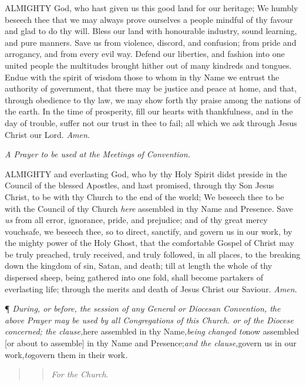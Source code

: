 ALMIGHTY
God, who hast given us this good land for our heritage; We humbly beseech
thee that we may always prove ourselves a people mindful of thy favour
and glad to do thy will. Bless our land with honourable industry, sound
learning, and pure manners. Save us from violence, discord, and confusion;
from pride and arrogancy, and from every evil way. Defend our liberties,
and fashion into one united people the multitudes brought hither out of
many kindreds and tongues. Endue with the spirit of wisdom those to whom
in thy Name we entrust the authority of government, that there may be
justice and peace at home, and that, through obedience to thy law, we
may show forth thy praise among the nations of the earth. In the time
of prosperity, fill our hearts with thankfulness, and in the day of trouble,
suffer not our trust in thee to fail; all which we ask through Jesus Christ
our Lord. \emph{Amen.}

\emph{A
Prayer to be used at the Meetings of Convention.}

ALMIGHTY
and everlasting God, who by thy Holy Spirit didst preside in the Council
of the blessed Apostles, and hast promised, through thy Son Jesus Christ,
to be with thy Church to the end of the world; We beseech thee to be with
the Council of thy Church \emph{here} assembled in thy Name and Presence.
Save \emph{us} from all error, ignorance, pride, and prejudice; and
of thy great mercy vouchsafe, we beseech thee, so to direct, sanctify,
and govern us in our work, by the mighty power of the Holy Ghost, that
the comfortable Gospel of Christ may be truly preached, truly received,
and truly followed, in all places, to the breaking down the kingdom of
sin, Satan, and death; till at length the whole of thy dispersed sheep,
being gathered into one fold, shall become partakers of everlasting life;
through the merits and death of Jesus Christ our Saviour. \emph{Amen}.

¶
\emph{During, or before, the session of any General or Diocesan Convention,
the above Prayer may be used by all Congregations of this Church. or of
the Diocese concerned; the clause,}here assembled in thy Name,\emph{being changed to}now assembled [or about to assemble] in thy Name
and Presence;\emph{and the clause,}govern us in our work,\emph{to}govern
them in their work\emph{.}

\begin{quote}

\begin{quote}

\emph{For
the Church}.

\end{quote}

\end{quote}

